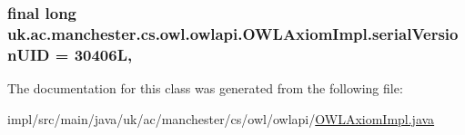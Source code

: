 \hypertarget{classuk_1_1ac_1_1manchester_1_1cs_1_1owl_1_1owlapi_1_1_o_w_l_axiom_impl_a33b620fcc431f2bd5ebc6c94f5f141e9}{
\subsubsection[{serial\-Version\-U\-I\-D}]{\setlength{\rightskip}{0pt plus 5cm}final long uk.\-ac.\-manchester.\-cs.\-owl.\-owlapi.\-O\-W\-L\-Axiom\-Impl.\-serial\-Version\-U\-I\-D = 30406\-L\hspace{0.3cm}{\ttfamily [static]}, {\ttfamily [private]}}}\label{classuk_1_1ac_1_1manchester_1_1cs_1_1owl_1_1owlapi_1_1_o_w_l_axiom_impl_a33b620fcc431f2bd5ebc6c94f5f141e9}


The documentation for this class was generated from the following file\-:\begin{DoxyCompactItemize}
\item 
impl/src/main/java/uk/ac/manchester/cs/owl/owlapi/\hyperlink{_o_w_l_axiom_impl_8java}{O\-W\-L\-Axiom\-Impl.\-java}\end{DoxyCompactItemize}

